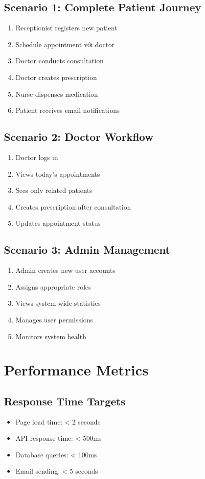\documentclass[12pt,a4paper]{report}
\begin{document}
\subsection{Scenario 1: Complete Patient Journey}
\begin{enumerate}
    \item Receptionist registers new patient
    \item Schedule appointment với doctor
    \item Doctor conducts consultation
    \item Doctor creates prescription
    \item Nurse dispenses medication
    \item Patient receives email notifications
\end{enumerate}

\subsection{Scenario 2: Doctor Workflow}
\begin{enumerate}
    \item Doctor logs in
    \item Views today's appointments
    \item Sees only related patients
    \item Creates prescription after consultation
    \item Updates appointment status
\end{enumerate}

\subsection{Scenario 3: Admin Management}
\begin{enumerate}
    \item Admin creates new user accounts
    \item Assigns appropriate roles
    \item Views system-wide statistics
    \item Manages user permissions
    \item Monitors system health
\end{enumerate}

\section{Performance Metrics}

\subsection{Response Time Targets}
\begin{itemize}
    \item Page load time: < 2 seconds
    \item API response time: < 500ms
    \item Database queries: < 100ms
    \item Email sending: < 5 seconds
\end{itemize}
\end{document}
